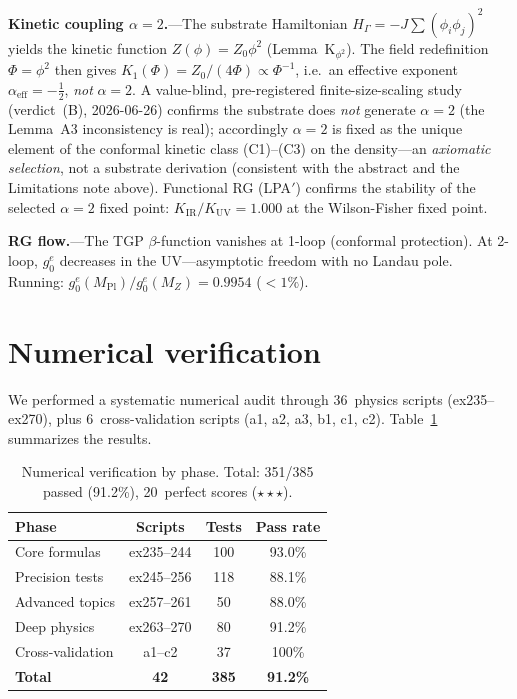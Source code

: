 \documentclass[aps,prl,twocolumn,superscriptaddress,showpacs,floatfix]{revtex4-2}
\newcommand{\gone}{{g_0^e}}
\begin{document}
\textbf{Kinetic coupling $\alpha = 2$.}---The substrate Hamiltonian
$H_\Gamma = -J\sum(\phi_i\phi_j)^2$ yields the kinetic function
$Z(\phi) = Z_0\phi^2$ (Lemma~K$_{\phi^2}$).
The field redefinition $\Phi = \phi^2$ then gives
$K_1(\Phi) = Z_0/(4\Phi)\propto\Phi^{-1}$, i.e.\ an effective exponent
$\alpha_\mathrm{eff} = -\tfrac12$, \emph{not} $\alpha = 2$.
A value-blind, pre-registered finite-size-scaling study (verdict~(B),
2026-06-26) confirms the substrate does \emph{not} generate $\alpha = 2$
(the Lemma~A3 inconsistency is real); accordingly $\alpha = 2$ is fixed as
the unique element of the conformal kinetic class (C1)--(C3) on the
density---an \emph{axiomatic selection}, not a substrate derivation
(consistent with the abstract and the Limitations note above).
Functional RG (LPA$'$) confirms the stability of the selected $\alpha = 2$
fixed point: $K_\mathrm{IR}/K_\mathrm{UV} = 1.000$ at the Wilson-Fisher
fixed point.

\textbf{RG flow.}---The TGP $\beta$-function vanishes at 1-loop
(conformal protection).
At 2-loop, $\gone$ decreases in the UV---asymptotic freedom with
no Landau pole.
Running: $\gone(M_\mathrm{Pl})/\gone(M_Z) = 0.9954$ ($< 1\%$).


\section{Numerical verification}

We performed a systematic numerical audit through 36~physics scripts
(ex235--ex270), plus 6~cross-validation scripts (a1, a2, a3, b1, c1, c2).
Table~\ref{tab:scores} summarizes the results.

\begin{table}[t]
\caption{Numerical verification by phase.
  Total: 351/385 passed (91.2\%), 20~perfect scores ($\star\star\star$).}
\label{tab:scores}
\begin{ruledtabular}
\begin{tabular}{lccc}
Phase & Scripts & Tests & Pass rate \\
\hline
Core formulas   & ex235--244 & 100 & 93.0\% \\
Precision tests & ex245--256 & 118 & 88.1\% \\
Advanced topics & ex257--261 &  50 & 88.0\% \\
Deep physics    & ex263--270 &  80 & 91.2\% \\
Cross-validation & a1--c2   &  37 & 100\% \\
\hline
\textbf{Total}  & \textbf{42} & \textbf{385} & \textbf{91.2\%} \\
\end{tabular}
\end{ruledtabular}
\end{table}
\end{document}
